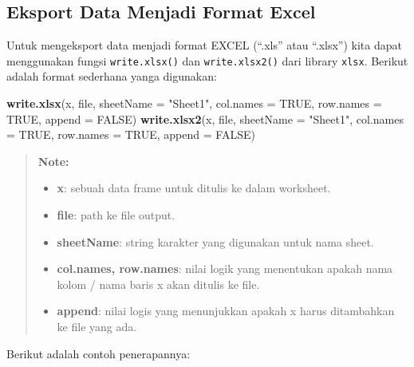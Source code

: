 \documentclass[]{book}
\newenvironment{Shaded}{\begin{snugshade}}{\end{snugshade}}
\newcommand{\KeywordTok}[1]{\textcolor[rgb]{0.13,0.29,0.53}{\textbf{#1}}}
\newcommand{\DataTypeTok}[1]{\textcolor[rgb]{0.13,0.29,0.53}{#1}}
\newcommand{\StringTok}[1]{\textcolor[rgb]{0.31,0.60,0.02}{#1}}
\newcommand{\OtherTok}[1]{\textcolor[rgb]{0.56,0.35,0.01}{#1}}
\newcommand{\NormalTok}[1]{#1}
\providecommand{\tightlist}{%
  \setlength{\itemsep}{0pt}\setlength{\parskip}{0pt}}
\begin{document}
\subsection{Eksport Data Menjadi Format
Excel}\label{eksport-data-menjadi-format-excel}

Untuk mengeksport data menjadi format EXCEL (``.xls'' atau ``.xlsx'')
kita dapat menggunakan fungsi \texttt{write.xlsx()} dan
\texttt{write.xlsx2()} dari library \texttt{xlsx}. Berikut adalah format
sederhana yanga digunakan:

\begin{Shaded}
\begin{Highlighting}[]
\KeywordTok{write.xlsx}\NormalTok{(x, file, }\DataTypeTok{sheetName =} \StringTok{"Sheet1"}\NormalTok{, }
  \DataTypeTok{col.names =} \OtherTok{TRUE}\NormalTok{, }\DataTypeTok{row.names =} \OtherTok{TRUE}\NormalTok{, }\DataTypeTok{append =} \OtherTok{FALSE}\NormalTok{)}
\KeywordTok{write.xlsx2}\NormalTok{(x, file, }\DataTypeTok{sheetName =} \StringTok{"Sheet1"}\NormalTok{,}
  \DataTypeTok{col.names =} \OtherTok{TRUE}\NormalTok{, }\DataTypeTok{row.names =} \OtherTok{TRUE}\NormalTok{, }\DataTypeTok{append =} \OtherTok{FALSE}\NormalTok{)}
\end{Highlighting}
\end{Shaded}

\begin{quote}
\textbf{Note: }

\begin{itemize}
\tightlist
\item
  \textbf{x}: sebuah data frame untuk ditulis ke dalam worksheet.
\item
  \textbf{file}: path ke file output.
\item
  \textbf{sheetName}: string karakter yang digunakan untuk nama sheet.
\item
  \textbf{col.names, row.names}: nilai logik yang menentukan apakah nama
  kolom / nama baris x akan ditulis ke file.
\item
  \textbf{append}: nilai logis yang menunjukkan apakah x harus
  ditambahkan ke file yang ada.
\end{itemize}
\end{quote}

Berikut adalah contoh penerapannya:
\end{document}
